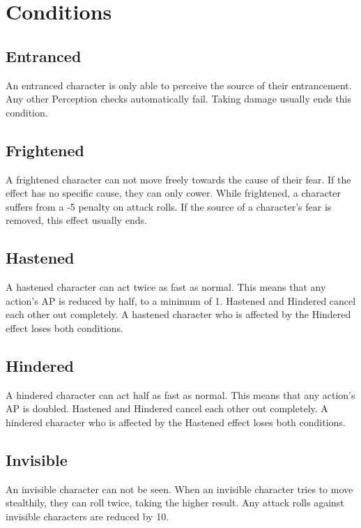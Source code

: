 \chapter{Conditions}\label{ch:conditions}
\section{Entranced}\label{condition:entranced}
An entranced character is only able to perceive the source of their entrancement.
Any other Perception checks automatically fail.
Taking damage usually ends this condition.

\section{Frightened}\label{condition:frightened}
A frightened character can not move freely towards the cause of their fear.
If the effect has no specific cause, they can only cower.
While frightened, a character suffers from a -5 penalty on attack rolls.
If the source of a character's fear is removed, this effect usually ends.

\section{Hastened}\label{condition:hastened}
A hastened character can act twice as fast as normal.
This means that any action's AP is reduced by half, to a minimum of 1.
Hastened and Hindered cancel each other out completely.
A hastened character who is affected by the Hindered effect loses both conditions.

\section{Hindered}\label{condition:hindered}
A hindered character can act half as fast as normal.
This means that any action's AP is doubled.
Hastened and Hindered cancel each other out completely.
A hindered character who is affected by the Hastened effect loses both conditions.

\section{Invisible}\label{condition:invisible}
An invisible character can not be seen.
When an invisible character tries to move stealthily, they can roll twice, taking the higher result.
Any attack rolls against invisible characters are reduced by 10.

